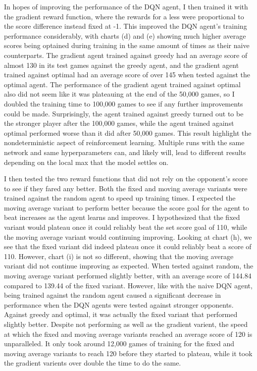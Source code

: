 \documentclass[12pt]{article}
\begin{document}
In hopes of improving the performance of the DQN agent, I then trained it with the gradient reward function, where the rewards for a less were proportional to the score difference instead fixed at -1. This improved the DQN agent's training performance considerably, with charts (d) and (e) showing much higher average scores being optained during training in the same amount of times as their naive counterparts. The gradient agent trained against greedy had an average score of almost 130 in its test games against the greedy agent, and the gradient agent trained against optimal had an average score of over 145 when tested against the optimal agent. The performance of the gradient agent trained against optimal also did not seem like it was plateauing at the end of the 50,000 games, so I doubled the training time to 100,000 games to see if any further improvements could be made. Surprisingly, the agent trained against greedy turned out to be the stronger player after the 100,000 games, while the agent trained against optimal performed worse than it did after 50,000 games. This result highlight the nondeterministic aspect of reinforcement learning. Multiple runs with the same network and same hyperparameters can, and likely will, lead to different results depending on the local max that the model settles on.

I then tested the two reward functions that did not rely on the opponent's score to see if they fared any better. Both the fixed and moving average variants were trained against the random agent to speed up training times. I expected the moving average variant to perform better because the score goal for the agent to beat increases as the agent learns and improves. I hypothesized that the fixed variant would plateau once it could reliably beat the set score goal of 110, while the moving average variant would continuing improving. Looking at chart (h), we see that the fixed variant did indeed plateau once it could reliably beat a score of 110. However, chart (i) is not so different, showing that the moving average variant did not continue improving as expected. When tested against random, the moving average variant performed slightly better, with an average score of 144.84 compared to 139.44 of the fixed variant. However, like with the naive DQN agent, being trained against the random agent caused a significant decrease in performance when the DQN agents were tested against stronger opponents. Against greedy and optimal, it was actually the fixed variant that performed slightly better. Despite not performing as well as the gradient varient, the speed at which the fixed and moving average variants reached an average score of 120 is unparalleled. It only took around 12,000 games of training for the fixed and moving average variants to reach 120 before they started to plateau, while it took the gradient varients over double the time to do the same.
\end{document}
